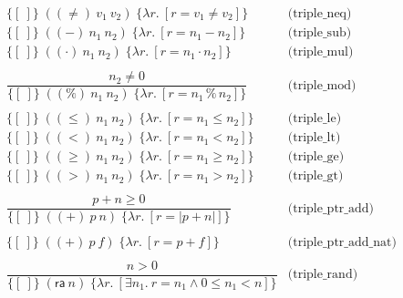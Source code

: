 \documentclass[10pt,a4paper]{article}
\newcommand{\emp}{[\: ]} %
\newcommand{\triple}[3]{\{#2\}\;#1\;\{#3\}}
\newcommand{\valint}[1]{#1}
\newcommand{\valloc}[1]{#1}
\newcommand{\isTrue}[1]{#1}
\newcommand{\abs}[1]{|#1|}
\newcommand{\Zrem}[2]{#1 \mathbin{\%} #2}
\newcommand{\fun}[2]{\lambda #1.~#2}
\begin{document}
\begin{multicols}{2}
\[\begin{array}{cl}
  \triple{((\neq)~v_1~v_2)}{\emp}{\fun{r}{[r = \isTrue{v_1 \neq v_2}]}} & \text{(triple\_neq)} \\
  \triple{((-)~n_1~n_2)}{\emp}{\fun{r}{[r = \valint{n_1 - n_2}]}} & \text{(triple\_sub)} \\
  \triple{((\cdot)~n_1~n_2)}{\emp}{\fun{r}{[r = \valint{n_1 \cdot n_2}]}} & \text{(triple\_mul)} \\
  \\
  \dfrac{n_2 \neq 0}
  {\triple{((\mathbin{\%})~n_1~n_2)}{\emp}{\fun{r}{[r = \valint{\Zrem{n_1}{n_2}}]}}} & \text{(triple\_mod)} \\
  \\
  \triple{((\le)~n_1~n_2)}{\emp}{\fun{r}{[r = \isTrue{n_1 \le n_2}]}} & \text{(triple\_le)} \\
  \triple{((<)~n_1~n_2)}{\emp}{\fun{r}{[r = \isTrue{n_1 < n_2}]}} & \text{(triple\_lt)} \\
  \triple{((\ge)~n_1~n_2)}{\emp}{\fun{r}{[r = \isTrue{n_1 \ge n_2}]}} & \text{(triple\_ge)} \\
  \triple{((>)~n_1~n_2)}{\emp}{\fun{r}{[r = \isTrue{n_1 > n_2}]}} & \text{(triple\_gt)} \\
  \\
  \dfrac{p + n \ge 0}
  {\triple{((+)~p~n)}{\emp}{\fun{r}{[r = \valloc{\abs{p + n}}]}}} & \text{(triple\_ptr\_add)} \\
  \\
  \triple{((+)~p~f)}{\emp}{\fun{r}{[r = \valloc{p + f}]}} & \text{(triple\_ptr\_add\_nat)} \\
\\
  \dfrac{n > 0}
    {\triple{(\mathsf{ra}~n)}{\emp}{\fun{r}{[\exists n_1.~ r = \valint{n_1} \wedge 0 \le n_1 < n]}}} & \text{(triple\_rand)} \\
\end{array}
\]
                                                                            
\end{multicols}
\end{document}
